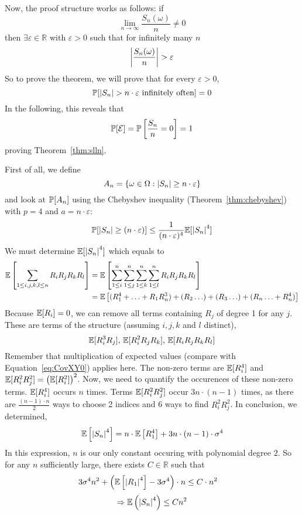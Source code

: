 Now, the proof structure works as follows: if
\[ \lim_{n\to\infty} \frac{S_n(\omega)}{n} \neq 0 \]
then $\exists \varepsilon \in \mathbb R$ with $\varepsilon > 0$ such that for infinitely many $n$
\[ \left\lvert{\frac{S_n(\omega)}{n}}\right\rvert > \varepsilon \]
So to prove the theorem, we will prove that for every $\varepsilon > 0$,
\[ \mathbb P[\left\lvert{S_n}\right\rvert > n \cdot \varepsilon \text{ infinitely often}] = 0 \]
In the following, this reveals that
\[ \mathbb P[\mathcal E] = \mathbb P\left[\frac{S_n}{n} = 0\right] = 1 \]
proving Theorem~\ref{thm:slln}.

First of all, we define
\[ A_n = \left\{\omega \in \Omega: \left\lvert{S_n}\right\rvert \geq n \cdot \varepsilon\right\} \]
and look at $\mathbb P[A_n]$ using the Chebyshev inequality (Theorem~\ref{thm:chebyshev}) with $p=4$ and $a=n\cdot\varepsilon$:
\[ \mathbb P[\left\lvert{S_n}\right\rvert \geq (n\cdot\varepsilon)] \leq \frac{1}{(n\cdot\varepsilon)^4} \mathbb E[\left\lvert{S_n}\right\rvert^4] \]
We must determine $\mathbb E[\left\lvert{S_n}\right\rvert^4]$ which equals to
\begin{align*}
  \mathbb E\left[\sum_{1 \leq i,j,k,l \leq n} R_i R_j R_k R_l\right]
    &= \mathbb E\left[\sum_{1\leq i}^n \sum_{1\leq j}^n \sum_{1\leq k}^n \sum_{1\leq l}^n R_i R_j R_k R_l\right] \notag\\
    &= \mathbb E\left[(R_1^4 + \ldots + R_1 R_n^3) + (R_2 \ldots) + (R_3 \ldots) + (R_n \ldots + R_n^4) \right]
\end{align*}
Because $\mathbb E[R_i] = 0$, we can remove all terms containing $R_j$ of degree 1 for any $j$.
These are terms of the structure (assuming $i, j, k$ and $l$ distinct),
\[
  \mathbb E[R_i^3 R_j], \,
  \mathbb E[R_i^2 R_j R_k], \,
  \mathbb E[R_i R_j R_k R_l]
\]
Remember that multiplication of expected values (compare with Equation~\ref{eq:CovXY0}) applies here.
The non-zero terms are $\mathbb E[R_i^4]$ and $\mathbb E[R_i^2 R_j^2] = \left(\mathbb E[R_i^2]\right)^2$.
Now, we need to quantify the occurences of these non-zero terms. $\mathbb E[R_i^4]$ occurs $n$ times.
Terms $\mathbb E[R_i^2 R_j^2]$ occur $3n \cdot (n-1)$ times, as there are $\frac{(n-1) \cdot n}{2}$ ways to choose 2 indices and 6 ways to find $R_i^2 R_j^2$.
In conclusion, we determined, %
\[ \mathbb E\left[\left\lvert{S_n}\right\rvert^4\right] = n \cdot \mathbb E\left[R_1^4\right] + 3n \cdot (n - 1) \cdot \sigma^4 \]
In this expression, $n$ is our only constant occuring with polynomial degree $2$. So for any $n$ sufficiently large, there exists $C \in \mathbb R$ such that
\begin{align}
  3 \sigma^4 n^2 + \left(\mathbb E\left[\left\lvert{R_1}\right\rvert^4\right] - 3 \sigma^4\right) \cdot n &\leq C \cdot n^2 \label{eq:3sigman2}
\end{align}
\[ \Rightarrow \mathbb E\left(\left\lvert{S_n}\right\rvert^4\right) \leq C n^2 \]

